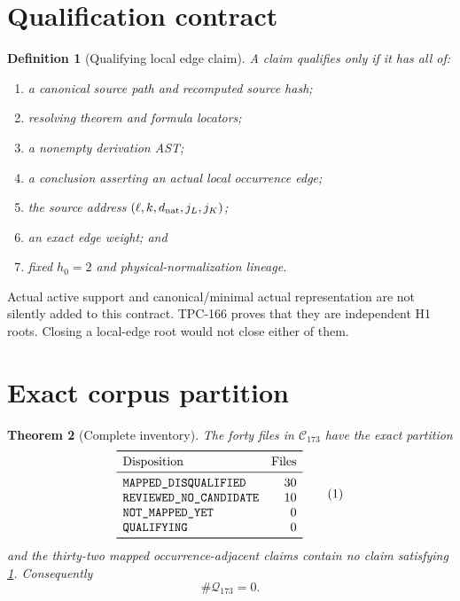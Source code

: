 \documentclass[11pt]{article}
\newtheorem{theorem}{Theorem}[section]
\newtheorem{definition}[theorem]{Definition}
\begin{document}
\section{Qualification contract}

\begin{definition}[Qualifying local edge claim]\label{def:qualifying}
A claim qualifies only if it has all of:
\begin{enumerate}
\item a canonical source path and recomputed source hash;
\item resolving theorem and formula locators;
\item a nonempty derivation AST;
\item a conclusion asserting an actual local occurrence edge;
\item the source address
 \((\ell,k,d_{\rm nat},j_L,j_K)\);
\item an exact edge weight; and
\item fixed \(h_0=2\) and physical-normalization lineage.
\end{enumerate}
\end{definition}

Actual active support and canonical/minimal actual representation are not
silently added to this contract.  TPC-166 proves that they are independent
H1 roots.  Closing a local-edge root would not close either of them.

\section{Exact corpus partition}

\begin{theorem}[Complete inventory]\label{thm:inventory}
The forty files in \(\mathcal C_{173}\) have the exact partition
\[
\begin{array}{lr}
\toprule
\text{Disposition}&\text{Files}\\
\midrule
\texttt{MAPPED\_DISQUALIFIED}&30\\
\texttt{REVIEWED\_NO\_CANDIDATE}&10\\
\texttt{NOT\_MAPPED\_YET}&0\\
\texttt{QUALIFYING}&0\\
\bottomrule
\end{array}
\tag{1}\label{eq:partition}
\]
and the thirty-two mapped occurrence-adjacent claims contain no claim
satisfying \cref{def:qualifying}.  Consequently
\[
 \boxed{\#\mathcal Q_{173}=0.}
\tag{2}\label{eq:zero}
\]
\end{theorem}
\end{document}
